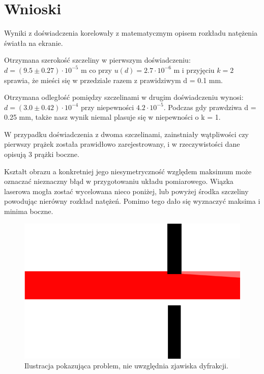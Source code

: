 \documentclass{article}
\begin{document}
\section{Wnioski}

Wyniki z doświadczenia korelowały z matematycznym opisem rozkładu natężenia światła na ekranie.

Otrzymana szerokość szczeliny w pierwszym doświadczeniu: $d = (9.5 \pm 0.27) \cdot 10^{-5}$ m co przy $u(d)= 2.7 \cdot 10^{-6}$ m i przyjęciu $k=2$ sprawia, że mieści się w przedziale razem z prawidziwym d = 0.1 mm.

Otrzymana odległość pomiędzy szczelinami w drugim doświadczeniu wynosi: $d = (3.0 \pm 0.42) \cdot 10^{-4}$ przy niepewności $4.2 \cdot 10^{-5}$.  Podczas gdy prawdziwa d = 0.25 mm, także nasz wynik niemal plasuje się w niepewności o k = 1.

W przypadku doświadczenia z dwoma szczelinami, zainstniały wątpliwości czy pierwszy prążek została prawidłowo zarejestrowany, i w rzeczywistości dane opisują 3 prążki boczne.

Kształt obrazu a konkretniej jego niesymetryczność względem maksimum może oznaczać nieznaczny błąd w przygotowaniu układu pomiarowego. Wiązka laserowa mogła zostać wycelowana nieco poniżej, lub powyżej środka szczeliny powodując nierówny rozkład natężeń. Pomimo tego dało się wyznaczyć maksima i minima boczne.

\begin{figure}[h!]
\centering
\includegraphics[scale=0.3]{ch05}
\caption{Ilustracja pokazująca problem, nie uwzględnia zjawiska dyfrakcji.}
\end{figure}





\end{document}
